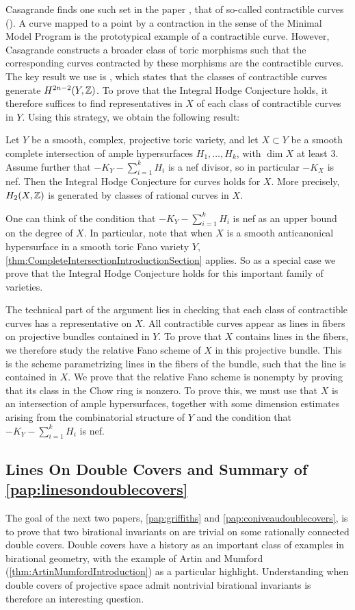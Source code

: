 Casagrande finds one such set in the paper \cite{Casagrande}, that of so-called contractible curves (\cite[Definition 2.3]{Casagrande}). A curve mapped to a point by a contraction in the sense of the Minimal Model Program is the prototypical example of a contractible curve. However, Casagrande constructs a broader class of toric morphisms such that the corresponding curves contracted by these morphisms are the contractible curves. The key result we use is \cite[Theorem 4.1]{Casagrande}, which states that the classes of contractible curves generate $H^{2n-2}(Y,\mathbb{Z})$. To prove that the Integral Hodge Conjecture holds, it therefore suffices to find representatives in $X$ of each class of contractible curves in $Y$. Using this strategy, we obtain the following result:
\begin{theorem}
	\label{thm:CompleteIntersectionIntroductionSection}
	Let $Y$ be a smooth, complex, projective toric variety, and let $X \subset Y$ be a smooth complete intersection of ample hypersurfaces $H_1,\dots,H_k$, with $\dim X$ at least $3$. Assume further that $-K_Y - \sum_{i=1}^kH_i$ is a nef divisor, so in particular $-K_X$ is nef. Then the Integral Hodge Conjecture for curves holds for $X$. More precisely, $H_2(X,\mathbb{Z})$ is generated by classes of rational curves in $X$.
\end{theorem}
One can think of the condition that $-K_Y - \sum_{i=1}^kH_i$ is nef as an upper bound on the degree of $X$. In particular, note that when $X$ is a smooth anticanonical hypersurface in a smooth toric Fano variety $Y$, \cref{thm:CompleteIntersectionIntroductionSection} applies. So as a special case we prove that the Integral Hodge Conjecture holds for this important family of \CY varieties.

The technical part of the argument lies in checking that each class of contractible curves has a representative on $X$. All contractible curves appear as lines in fibers on projective bundles contained in $Y$. To prove that $X$ contains lines in the fibers, we therefore study the relative Fano scheme of $X$ in this projective bundle. This is the scheme parametrizing lines in the fibers of the bundle, such that the line is contained in $X$. We prove that the relative Fano scheme is nonempty by proving that its class in the Chow ring is nonzero. To prove this, we must use that $X$ is an intersection of ample hypersurfaces, together with some dimension estimates arising from the combinatorial structure of $Y$ and the condition that $-K_Y - \sum_{i=1}^kH_i$ is nef.

\subsection{Lines On Double Covers and Summary of \cref{pap:linesondoublecovers}}
The goal of the next two papers, \cref{pap:griffiths} and \cref{pap:coniveaudoublecovers}, is to prove that two birational invariants on are trivial on some rationally connected double covers. Double covers have a history as an important class of examples in birational geometry, with the example of Artin and Mumford (\cref{thm:ArtinMumfordIntroduction}) as a particular highlight. Understanding when double covers of projective space admit nontrivial birational invariants is therefore an interesting question.

